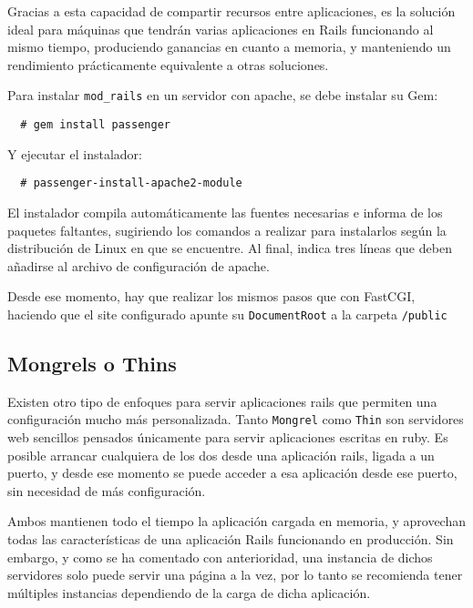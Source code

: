 Gracias a esta capacidad de compartir recursos entre aplicaciones, es la solución ideal para máquinas que tendrán varias aplicaciones en Rails funcionando al mismo tiempo, produciendo ganancias en cuanto a memoria, y manteniendo un rendimiento prácticamente equivalente a otras soluciones.

Para instalar \texttt{mod\_rails} en un servidor con apache, se debe instalar su Gem:

\begin{verbatim}
  # gem install passenger
\end{verbatim}

Y ejecutar el instalador:

\begin{verbatim}
  # passenger-install-apache2-module
\end{verbatim}

El instalador compila automáticamente las fuentes necesarias e informa de los paquetes faltantes, sugiriendo los comandos a realizar para instalarlos según la distribución de Linux en que se encuentre. Al final, indica tres líneas que deben añadirse al archivo de configuración de apache.

Desde ese momento, hay que realizar los mismos pasos que con FastCGI, haciendo que el site configurado apunte su \texttt{DocumentRoot} a la carpeta \texttt{/public}


\subsection{Mongrels o Thins} %
\label{sub:mongrels_thins}

Existen otro tipo de enfoques para servir aplicaciones rails que permiten una configuración mucho más personalizada. Tanto \texttt{Mongrel} como \texttt{Thin} son servidores web sencillos pensados únicamente para servir aplicaciones escritas en ruby. Es posible arrancar cualquiera de los dos desde una aplicación rails, ligada a un puerto, y desde ese momento se puede acceder a esa aplicación desde ese puerto, sin necesidad de más configuración.

Ambos mantienen todo el tiempo la aplicación cargada en memoria, y aprovechan todas las características de una aplicación Rails funcionando en producción. Sin embargo, y como se ha comentado con anterioridad, una instancia de dichos servidores solo puede servir una página a la vez, por lo tanto se recomienda tener múltiples instancias dependiendo de la carga de dicha aplicación.

